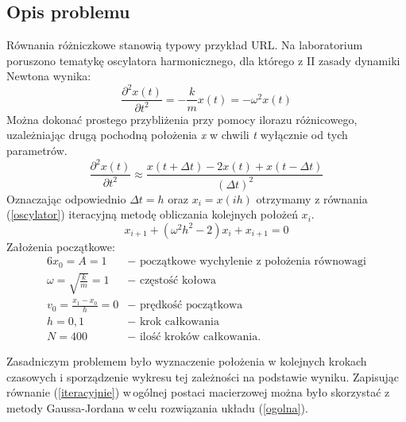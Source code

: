 \subsection{Opis problemu}
Równania różniczkowe stanowią typowy przykład URL. Na laboratorium poruszono tematykę oscylatora harmonicznego, dla którego z II zasady dynamiki Newtona wynika:
\begin{equation}
\frac{\partial^2 x(t)}{\partial t^2} = - \frac{k}{m} x(t) = -\omega^2 x(t)
\label{oscylator}
\end{equation}
Można dokonać prostego przybliżenia przy pomocy ilorazu różnicowego, uzależniając drugą pochodną położenia \textit{x} w chwili \textit{t} wyłącznie od tych parametrów.
\begin{equation}
\frac{\partial^2 x(t)}{\partial t^2} \approx \frac{x(t+\Delta t) - 2x(t) + x(t - \Delta t)}{(\Delta t)^2}
\end{equation}
Oznaczając odpowiednio $\Delta t = h$ oraz $x_i = x(ih)$ otrzymamy z równania (\ref{oscylator}) iteracyjną metodę obliczania kolejnych położeń $x_i$.
\begin{equation}
x_{i+1} +(\omega^2 h^2 - 2)x_i + x_{i+1} = 0
\label{iteracyjnie}
\end{equation}
Założenia początkowe:
\begin{alignat*}{6}
	x_0 = A = 1 &- \text{ początkowe wychylenie z położenia równowagi} \\
	\omega = \sqrt{\frac{k}{m}} = 1 &- \text{ częstość kołowa} \\
	v_0 = \frac{x_1 - x_0}{h} = 0 &- \text{ prędkość początkowa} \\
	h = 0,1 &- \text{ krok całkowania} \\
	N = 400 &- \text{ ilość kroków całkowania.}
\end{alignat*}

Zasadniczym problemem było wyznaczenie położenia w kolejnych krokach czasowych i sporządzenie wykresu tej zależności na podstawie wyniku. Zapisując równanie (\ref{iteracyjnie}) w\,ogólnej postaci macierzowej można było skorzystać z metody Gaussa-Jordana w\,celu rozwiązania układu (\ref{ogolna}).

